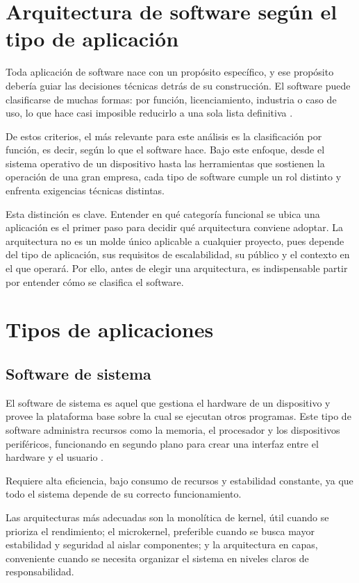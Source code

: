 \documentclass[12pt, letterpaper]{article}
\begin{document}
\section*{Arquitectura de software según el tipo de aplicación}

Toda aplicación de software nace con un propósito específico, y ese propósito debería guiar las decisiones técnicas detrás de su construcción. El software puede clasificarse de muchas formas: por función, licenciamiento, industria o caso de uso, lo que hace casi imposible reducirlo a una sola lista definitiva \parencite{fazio2025software}.

De estos criterios, el más relevante para este análisis es la clasificación por función, es decir, según lo que el software hace. Bajo este enfoque, desde el sistema operativo de un dispositivo hasta las herramientas que sostienen la operación de una gran empresa, cada tipo de software cumple un rol distinto y enfrenta exigencias técnicas distintas.

Esta distinción es clave. Entender en qué categoría funcional se ubica una aplicación es el primer paso para decidir qué arquitectura conviene adoptar. La arquitectura no es un molde único aplicable a cualquier proyecto, pues depende del tipo de aplicación, sus requisitos de escalabilidad, su público y el contexto en el que operará. Por ello, antes de elegir una arquitectura, es indispensable partir por entender cómo se clasifica el software.
\section*{Tipos de aplicaciones}
\subsection{Software de sistema}
El software de sistema es aquel que gestiona el hardware de un dispositivo y provee la plataforma base sobre la cual se ejecutan otros programas. Este tipo de software administra recursos como la memoria, el procesador y los dispositivos periféricos, funcionando en segundo plano para crear una interfaz entre el hardware y el usuario \parencite{finoit2025software}.

Requiere alta eficiencia, bajo consumo de recursos y estabilidad constante, ya que todo el sistema depende de su correcto funcionamiento.

Las arquitecturas más adecuadas son la monolítica de kernel, útil cuando se prioriza el rendimiento; el microkernel, preferible cuando se busca mayor estabilidad y seguridad al aislar componentes; y la arquitectura en capas, conveniente cuando se necesita organizar el sistema en niveles claros de responsabilidad.
\end{document}
